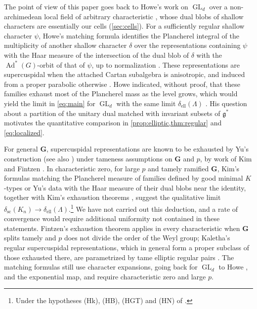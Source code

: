 \documentclass[11pt,reqno]{amsart}
\numberwithin{equation}{section}
\theoremstyle{plain}
\theoremstyle{definition}
\theoremstyle{remark}
\theoremstyle{plain}
\newcommand{\Lat}{\mathcal{L}}   %
\newcommand{\dLat}{\Lambda}      %
\newcommand{\bG}{\mathbf{G}}     %
\newcommand{\g}{\mathfrak{g}}    %
\newcommand{\gd}{\mathfrak{g}^*} %
\newcommand{\scd}[1]{\delta_{\mathrm{sc}}(#1)}
\newcommand{\elld}[2][]{\delta_{\mathrm{ell}}^{#1}(#2)}  %
\DeclareMathOperator{\Ad}{Ad}
\DeclareMathOperator{\GL}{GL}
\begin{document}
The point of view of this paper goes back to Howe's work on $\GL_d$
over a non-archimedean local field of arbitrary characteristic
\cite{MR0492088}, whose dual blobs of shallow characters are essentially
our cells (\cref{sec:cells}). For a sufficiently regular
shallow character $\psi$, Howe's matching formula identifies the
Plancherel integral of the multiplicity of another shallow character
$\delta$ over the representations containing $\psi$ with the Haar
measure of the intersection of the dual blob of $\delta$ with the
$\Ad^*(G)$-orbit of that of $\psi$, up to normalization
\cite[Theorem~4.1]{MR0492088}. These representations are supercuspidal
when the attached Cartan subalgebra is anisotropic, and induced from a
proper parabolic otherwise \cite[\S3]{MR0492088}.
Howe indicated, without proof, that these families exhaust most of the
Plancherel mass as the level grows, which would yield the limit in
\eqref{eq:main} for $\GL_d$ with the same limit $\elld{\dLat}$
\cite[\S4, (1)--(3)]{MR0492088}. His question about a partition of the
unitary dual matched with invariant subsets of $\gd$
\cite[end of \S4]{MR0492088} motivates the quantitative comparison in
\cref{prop:elliptic,thm:regular} and \eqref{eq:localized}.

For general $\bG$, supercuspidal representations are known to be exhausted
by Yu's construction \cite{MR1824988} (see also \cite{MR4357723}) under
tameness assumptions on $\bG$ and $p$, by work of Kim \cite{MR2276772} and
Fintzen \cite{MR4199732}. In characteristic zero, for large $p$ and
tamely ramified $\bG$, Kim's formulas matching the Plancherel measure of
families defined by good minimal $K$-types
\cite[Theorem~3.3.1]{MR2075916} or Yu's data
\cite[Theorem~10.1]{MR2276772} with the Haar measure of their dual
blobs near the identity, together with Kim's exhaustion theorems
\cite[Theorems~11.1 and~19.1]{MR2276772}, suggest the qualitative limit
$\scd{K_n}\to\elld{\dLat}$.\footnote{Under the hypotheses (Hk), (HB),
(HGT) and (HN) of \cite[\S3.4]{MR2276772}.} We have not carried out this
deduction, and a rate of convergence would require additional uniformity
not contained in these statements.
Fintzen's exhaustion theorem \cite[Theorem~8.1]{MR4199732} applies in
every characteristic when $\bG$ splits tamely and $p$ does not divide
the order of the Weyl group; Kaletha's regular supercuspidal
representations, which in general form a proper subclass of those
exhausted there, are parametrized by tame elliptic regular pairs
\cite[Proposition~3.7.14]{MR4013740}. The matching formulas still use
character expansions, going back for $\GL_d$ to Howe
\cite{MR0342645}, and the exponential map, and require characteristic
zero and large $p$.
\end{document}
